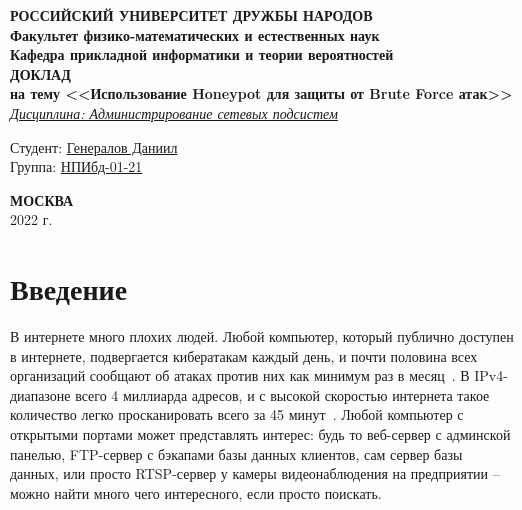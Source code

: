 \documentclass[a4page]{article}
\begin{document}
 
 
\begin{titlepage}

\begin{center}
\hfill \break
\textbf{
\large{РОССИЙСКИЙ УНИВЕРСИТЕТ ДРУЖБЫ НАРОДОВ}\\
\normalsize{Факультет физико-математических и естественных наук}\\ 
\normalsize{Кафедра прикладной информатики и теории вероятностей}\\
}
\vspace*{\fill}
\Large{\textbf{ДОКЛАД\\ на тему <<Использование Honeypot для защиты от Brute Force атак>>}}
\\
\underline{\textit{\normalsize{Дисциплина: Администрирование сетевых подсистем}}}
\vspace*{\fill}

\end{center}
 
 \begin{flushright}
 Студент: \underline{Генералов Даниил}\\ \vspace{0.5cm}
 Группа: \underline{НПИбд-01-21}
 \end{flushright}
 
 
\begin{center} \textbf{МОСКВА} \\ 2022 г. \end{center}
\thispagestyle{empty} %
 
\end{titlepage}

\newpage

\tableofcontents

\newpage

\newcommand{\code}[1]{\texttt{#1}}

\section{Введение}

В интернете много плохих людей. Любой компьютер, который публично доступен в интернете, подвергается кибератакам каждый день, и почти половина всех организаций сообщают об атаках против них как минимум раз в месяц~\cite{govuk:cyber}. В IPv4-диапазоне всего 4 миллиарда адресов, и с высокой скоростью интернета такое количество легко просканировать всего за 45 минут~\cite{scan-the-web}. Любой компьютер с открытыми портами может представлять интерес: будь то веб-сервер с админской панелью, FTP-сервер с бэкапами базы данных клиентов, сам сервер базы данных, или просто RTSP-сервер у камеры видеонаблюдения на предприятии – можно найти много чего интересного, если просто поискать.
\end{document}
